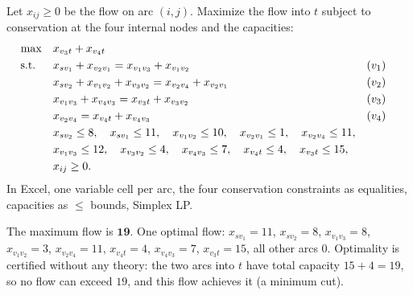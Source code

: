 
Let $x_{ij} \geq 0$ be the flow on arc $(i,j)$. Maximize the flow into $t$ subject to conservation at the four internal nodes and the capacities:
\begin{align*}
\max \quad & x_{v_3 t} + x_{v_4 t}\\
\text{s.t.}\;\; \quad & x_{s v_1} + x_{v_2 v_1} = x_{v_1 v_3} + x_{v_1 v_2} && (v_1)\\
& x_{s v_2} + x_{v_1 v_2} + x_{v_3 v_2} = x_{v_2 v_4} + x_{v_2 v_1} && (v_2)\\
& x_{v_1 v_3} + x_{v_4 v_3} = x_{v_3 t} + x_{v_3 v_2} && (v_3)\\
& x_{v_2 v_4} = x_{v_4 t} + x_{v_4 v_3} && (v_4)\\
& x_{s v_2} \leq 8, \quad x_{s v_1} \leq 11, \quad x_{v_1 v_2} \leq 10, \quad x_{v_2 v_1} \leq 1, \quad x_{v_2 v_4} \leq 11,\\
& x_{v_1 v_3} \leq 12, \quad x_{v_3 v_2} \leq 4, \quad x_{v_4 v_3} \leq 7, \quad x_{v_4 t} \leq 4, \quad x_{v_3 t} \leq 15,\\
& x_{ij} \geq 0.
\end{align*}
In Excel, one variable cell per arc, the four conservation constraints as equalities, capacities as $\leq$ bounds, Simplex LP.

The maximum flow is $\mathbf{19}$. One optimal flow: $x_{s v_1} = 11$, $x_{s v_2} = 8$, $x_{v_1 v_3} = 8$, $x_{v_1 v_2} = 3$, $x_{v_2 v_4} = 11$, $x_{v_4 t} = 4$, $x_{v_4 v_3} = 7$, $x_{v_3 t} = 15$, all other arcs $0$. Optimality is certified without any theory: the two arcs into $t$ have total capacity $15 + 4 = 19$, so no flow can exceed $19$, and this flow achieves it (a minimum cut).


